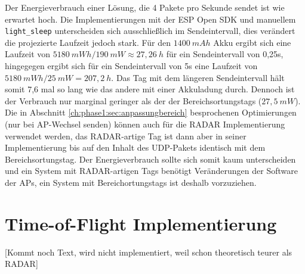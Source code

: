 Der Energieverbrauch einer Lösung, die 4 Pakete pro Sekunde sendet ist wie erwartet hoch.
Die Implementierungen mit der ESP Open SDK und manuellem \texttt{light\_sleep} unterscheiden sich ausschließlich im Sendeintervall, dies verändert die projezierte Laufzeit jedoch stark.
Für den $1400\ mAh$ Akku ergibt sich eine Laufzeit von $5180\ mWh/190\ mW \approx 27,26\ h$ für ein Sendeintervall von 0,25s, hingegegen ergibt sich für ein Sendeintervall von 5s eine Laufzeit von $5180\ mWh/25\ mW = 207,2\ h$.
Das Tag mit dem längeren Sendeintervall hält somit 7,6 mal so lang wie das andere mit einer Akkuladung durch. 
Dennoch ist der Verbrauch nur marginal geringer als der der Bereichsortungstags ($27,5\ mW$). \\
Die in Abschnitt \ref{ch:phase1:sec:anpassungbereich} besprochenen Optimierungen (nur bei AP-Wechsel senden) können auch für die RADAR Implementierung verwendet werden, das RADAR-artige Tag ist dann aber in seiner Implementierung bis auf den Inhalt des UDP-Pakets identisch mit dem Bereichsortungstag.
Der Energieverbrauch sollte sich somit kaum unterscheiden und ein System mit RADAR-artigen Tags benötigt Veränderungen der Software der APs, ein System mit Bereichortungstags ist deshalb vorzuziehen. \\

\section{Time-of-Flight Implementierung}
[Kommt noch Text, wird nicht implementiert, weil schon theoretisch teurer als RADAR]


